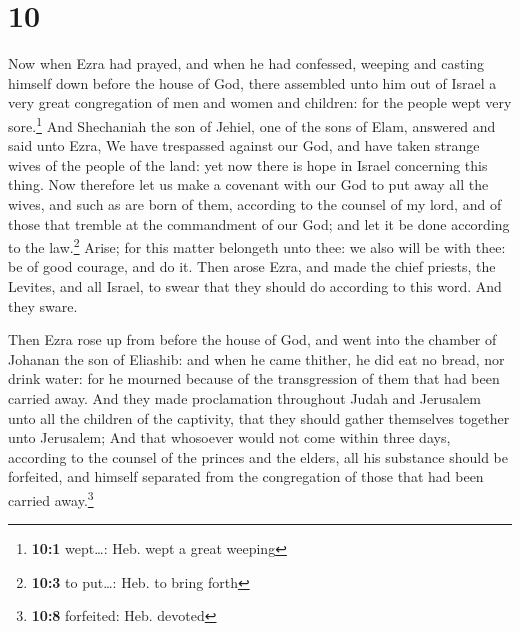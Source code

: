\hypertarget{section-9}{%
\section{10}\label{section-9}}

 Now when Ezra had prayed, and when he had confessed,
weeping and casting himself down before the house of God, there
assembled unto him out of Israel a very great congregation of men and
women and children: for the people wept very sore.\footnote{\textbf{10:1}
  wept\ldots: Heb. wept a great weeping}  And Shechaniah
the son of Jehiel, one of the sons of Elam, answered and said unto Ezra,
We have trespassed against our God, and have taken strange wives of the
people of the land: yet now there is hope in Israel concerning this
thing.  Now therefore let us make a covenant with our God
to put away all the wives, and such as are born of them, according to
the counsel of my lord, and of those that tremble at the commandment of
our God; and let it be done according to the law.\footnote{\textbf{10:3}
  to put\ldots: Heb. to bring forth}  Arise; for this
matter belongeth unto thee: we also will be with thee: be of good
courage, and do it.  Then arose Ezra, and made the chief
priests, the Levites, and all Israel, to swear that they should do
according to this word. And they sware.

 Then Ezra rose up from before the house of God, and went
into the chamber of Johanan the son of Eliashib: and when he came
thither, he did eat no bread, nor drink water: for he mourned because of
the transgression of them that had been carried away.  And
they made proclamation throughout Judah and Jerusalem unto all the
children of the captivity, that they should gather themselves together
unto Jerusalem;  And that whosoever would not come within
three days, according to the counsel of the princes and the elders, all
his substance should be forfeited, and himself separated from the
congregation of those that had been carried away.\footnote{\textbf{10:8}
  forfeited: Heb. devoted}

